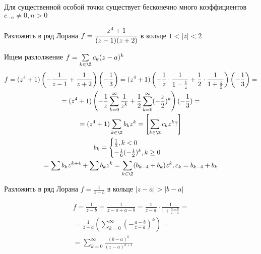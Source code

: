\begin{remrk}
    Для существенной особой точки существует бесконечно много коэффициентов $c_{-n} \neq 0, n > 0$
\end{remrk}

\begin{exmpl}
    Разложить в ряд Лорана $f = \cfrac{z^4 + 1}{(z - 1)(z + 2)}$ в кольце $1 < |z| < 2$
\end{exmpl}

\begin{sol}
    Ищем разлолжение $f = \sum\limits_{k \in \Z}c_k(z - a)^k$
    \begin{gather*}
        f = (z^4 + 1)\left( -\frac{1}{z - 1} + \frac{1}{z + 2} \right) \left( -\frac{1}{3} \right) = (z^4 + 1)\left( -\frac{1}{z} \cdot \frac{1}{1 - \frac{1}{z}} + \frac{1}{2} \cdot \frac{1}{1 + \frac{z}{2}} \right) \left( -\frac{1}{3} \right) = \\
        = (z^4 + 1)\left( -\frac{1}{z}\sum\limits_{k = 0}^{\infty}\frac{1}{z^k} + \frac{1}{2}\sum\limits_{k = 0}^{\infty} (-\frac{z}{2})^k\right) (-\frac{1}{3}) = \\
        = (z^4 + 1)\sum\limits_{k \in \Z}b_k z^k = \left[ \sum\limits_{k \in \Z}c_k z^k ?\right] \\ 
        b_k = \begin{cases}
            \frac{1}{3}, k < 0 \\ 
            -\frac{1}{6}(-\frac{1}{2})^k, k \geq 0
        \end{cases} \\ 
        = \sum b_k z^{k + 4} + \sum b_k z^k = \sum\limits_{k \in \Z}(b_{k - 4} + b_k) z^k, c_k = b_{k - 4} + b_k
    \end{gather*}
\end{sol}

\begin{exmpl}
    Разложить в ряд Лорана $f = \frac{1}{z - b}$ в кольце $|z - a| > |b - a|$
\end{exmpl}
\begin{sol}
    \begin{gather*}
        f = \frac{1}{z - b} = \frac{1}{z - a + a - b} = \frac{1}{z - a} \cdot \frac{1}{1  + \frac{a - b}{z - a}} = \\ 
        = \frac{1}{z - a}\left( \sum\limits_{k = 0}^{\infty} \left(-\frac{a - b}{z - a}\right)^k \right) = \\
        = \sum\limits_{k = 0}^{\infty} \frac{(b - a)^k}{(z - a)^{k + 1}}
    \end{gather*}
\end{sol}

